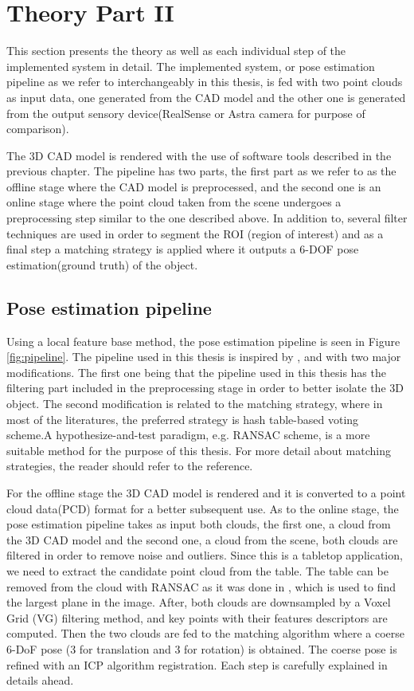 
\chapter{Theory Part II}
\label{chap:theo}
This section presents the theory as well as each individual step of the implemented system in detail. The implemented system, or pose estimation pipeline as we refer to interchangeably in this thesis, is fed with two point clouds as input data, one generated from the CAD model and the other one is generated from the output sensory device(RealSense or Astra camera for purpose of comparison).

The 3D CAD model is rendered with the use of software tools described in the previous chapter. The pipeline has two parts, the first part as we refer to as the offline stage where the CAD model is preprocessed, and the second one is an online stage where the point cloud taken from the scene undergoes a preprocessing step similar to the one described above. In addition to, several filter techniques are used in order to segment the ROI (region of interest) and as a final step a matching strategy is applied where it outputs a 6-DOF pose estimation(ground truth) of the object.  

\section{Pose estimation pipeline}
Using a local feature base method, the pose estimation pipeline is seen in Figure \ref{fig:pipeline}. The pipeline used in this thesis is inspired by \cite{cadPipeline1}, \cite{cadPipeline2} and \cite{cadPipeline3} with two major modifications. The first one being that the pipeline used in this thesis has the filtering part included in the preprocessing stage in order to better isolate the 3D object. The second modification is related to the matching strategy\cite{repMatching}, where in most of the literatures, the preferred strategy is hash table-based voting scheme.A hypothesize-and-test paradigm\cite{repMatching}, e.g. RANSAC scheme, is a more suitable method for the purpose of this thesis. For more detail about matching strategies, the reader should refer to the reference. 

For the offline stage the 3D CAD model is rendered and it is converted to a point cloud data(PCD) format for a better subsequent use. As to the online stage, the pose estimation pipeline takes as input both clouds, the first one, a cloud from the 3D CAD model and the second one, a cloud from the scene, both clouds are filtered in order to remove noise and outliers. Since this is a tabletop application, we need to extract the candidate point cloud from the table. The table can be removed from the cloud with RANSAC as it was done in \cite{cadPipeline3}, which is used to find the largest plane in the image. After, both clouds are downsampled by a Voxel Grid (VG) filtering method, and key points with their features descriptors are computed. Then the two clouds are fed to the matching algorithm where a coerse 6-DoF pose (3 for translation and 3 for rotation) is obtained. The coerse pose is refined with an ICP algorithm registration. Each step is carefully explained in details ahead. 

